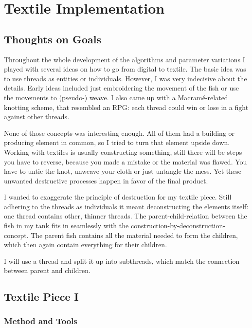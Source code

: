 \documentclass{scrartcl}
\begin{document}
\section{Textile Implementation}
\subsection{Thoughts on Goals}

Throughout the whole development of the algorithms and parameter variations I played with several ideas on how to go from digital to textile. The basic idea was to use threads as entities or individuals. However, I was very indecisive about the details. Early ideas included just embroidering the movement of the fish or use the movements to (pseudo-) weave. I also came up with a Macramé-related knotting scheme, that resembled an RPG: each thread could win or lose in a fight against other threads. 

None of those concepts was interesting enough. All of them had a building or producing element in common, so I tried to turn that element upside down.
Working with textiles is usually constructing something, still there will be steps you have to reverse, because you made a mistake or the material was flawed. You have to untie the knot, unweave your cloth or just untangle the mess. Yet these unwanted destructive processes happen in favor of the final product.

I wanted to exaggerate the principle of destruction for my textile piece.
Still adhering to the threads as individuals it meant deconstructing the elements itself: one thread contains other, thinner threads.
The parent-child-relation between the fish in my tank fits in seamlessly with the construction-by-deconstruction-concept. The parent fish contains all the material needed to form the children, which then again contain everything for their children.

I will use a thread and split it up into subthreads, which match the connection between parent and children.


\subsection{Textile Piece I}
\subsubsection{Method and Tools}
\end{document}
